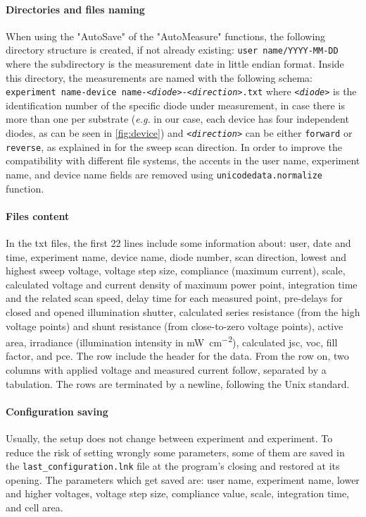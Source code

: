 \paragraph{Directories and files naming}
When using the "AutoSave" of the "AutoMeasure" functions, the following directory structure is created, if not already existing: \texttt{user name\-/YYYY-MM-DD} where the subdirectory is the measurement date in little endian format.
Inside this directory, the measurements are named with the following schema: \texttt{experiment name-device name-\textit{<diode>}-\textit{<direction>}.txt} where \textit{\texttt{<diode>}} is the identification number of the specific diode under measurement, in case there is more than one per substrate (\textsl{e.g.} in our case, each device has four independent diodes, as can be seen in \cref{fig:device}) and \texttt{\textit{<direction>}} can be either \texttt{forward} or \texttt{reverse}, as explained in  for the sweep scan direction.
In order to improve the compatibility with different file systems, the accents in the user name, experiment name, and device name fields are removed using \texttt{unicode\-data.\-normalize} function.

\paragraph{Files content}
In the txt files, the first 22 lines include some information about: user, date and time, experiment name, device name, diode number, scan direction, lowest and highest sweep voltage, voltage step size, compliance (maximum current), scale, calculated voltage and current density of maximum power point, integration time and the related scan speed, delay time for each measured point, pre-delays for closed and opened illumination shutter, calculated series resistance (from the high voltage points) and shunt resistance (from close\hyp{}to\hyp{}zero voltage points), active area, irradiance (illumination intensity in \si{\mW\per\square\cm}), calculated \gls{jsc}, \gls{voc}, fill factor, and \gls{pce}.
The  row include the header for the data.
From the  row on, two columns with applied voltage and measured current follow, separated by a tabulation.
The rows are terminated by a \texttt{\n} newline, following the Unix standard.

\paragraph{Configuration saving}
Usually, the setup does not change between experiment and experiment.
To reduce the risk of setting wrongly some parameters, some of them are saved in the \texttt{last\_configuration.lnk} file at the program's closing and restored at its opening.
The parameters which get saved are: user name, experiment name, lower and higher voltages, voltage step size, compliance value, scale, integration time, and cell area.

